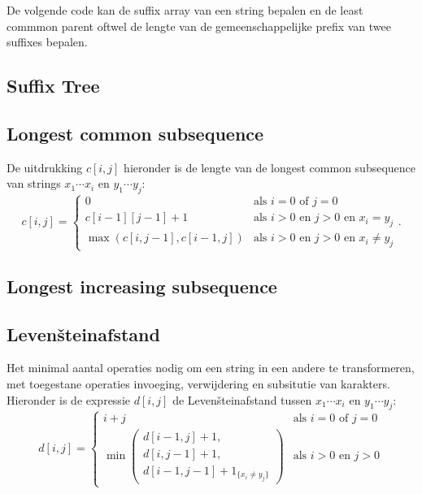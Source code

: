 \documentclass[10pt,a4paper,titlepage]{article}
\begin{document}
De volgende code kan de suffix array van een string bepalen en de least commmon parent oftwel de lengte van de gemeenschappelijke prefix van twee suffixes bepalen.



\subsection{Suffix Tree}



\subsection{Longest common subsequence}

De uitdrukking $c[i,j]$ hieronder is de lengte van de longest common subsequence van strings $x_1\cdots x_i$ en $y_1\cdots y_j$:
\[ c[i,j] = \left\{\begin{array}{ll}
0 & \text{als $i = 0$ of $j = 0$} \\
c[i-1][j-1] + 1 & \text{als $i > 0$ en $j > 0$ en $x_i = y_j$} \\
\max (c[i,j-1], c[i-1,j]) & \text{als $i > 0$ en $j > 0$ en $x_i \neq y_j$}
\end{array}\right. .
 \]

\subsection{Longest increasing subsequence}

\fi

\subsection{Levenšteinafstand}
Het minimal aantal operaties nodig om een string in een andere te transformeren, met toegestane operaties invoeging, verwijdering en subsitutie van karakters. Hieronder is de expressie $d[i,j]$ de Levenšteinafstand tussen $x_1\cdots x_i$ en $y_1\cdots y_j$:
\[ d[i,j] = \left\{\begin{array}{ll}
i+j & \text{als $i = 0$ of $j=0$} \\
\min\left(\begin{array}{c}d[i-1,j]+1,\\ d[i,j-1]+1,\\ d[i-1,j-1] + 1_{\{x_i \neq y_j\}}\end{array}\right) & \text{als $i > 0$ en $j>0$}
\end{array}\right.
\]
\end{document}

